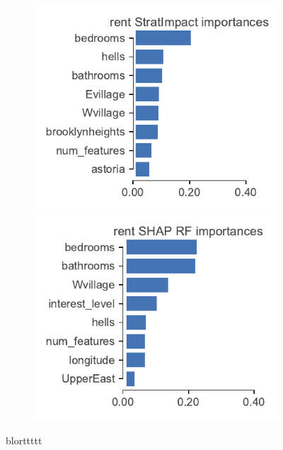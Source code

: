 \documentclass[11pt]{article}
\begin{document}
{\begin{figure}
\begin{subfigure}{1\textwidth}
\vspace{-2mm}\vspace{3mm}
\end{subfigure}%
\hfill
\begin{subfigure}{1\textwidth}
    \centering
\includegraphics[scale=0.5]{images/rent-features.pdf}
\includegraphics[scale=0.5]{images/rent-features-shap-rf.pdf}
\vspace{-2mm}\vspace{3mm}
\end{subfigure}
\caption[short]{blorttttt}
\label{fig:features}
\end{figure}
}

\vskip 0.2in

\end{document}
